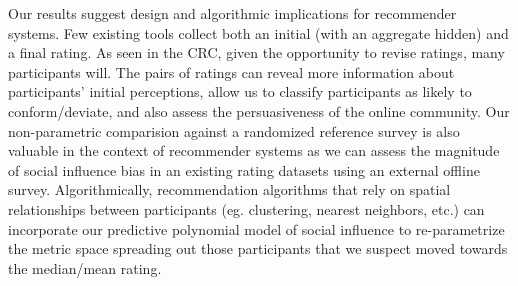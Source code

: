 Our results suggest design and algorithmic implications for recommender systems.
Few existing tools collect both an initial (with an aggregate hidden) and a final rating.
As seen in the CRC, given the opportunity to revise ratings, many participants will.
The pairs of ratings can reveal more information about participants' initial perceptions, allow us to classify participants as likely to conform/deviate, and also assess the persuasiveness of the online community.
Our non-parametric comparision against a randomized reference survey is also valuable in the context of recommender systems as we can assess the magnitude of social influence bias in an existing rating datasets using an external offline survey.
Algorithmically, recommendation algorithms that rely on spatial relationships between participants (eg. clustering, nearest neighbors, etc.) can incorporate our predictive polynomial model of social influence to re-parametrize the metric space spreading out those participants that we suspect moved towards the median/mean rating.


